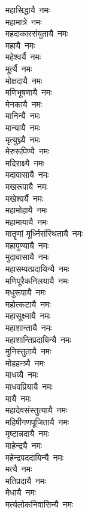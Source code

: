 \begin{flushleft}
\begin{multicols}{2}
महासिद्धायै~नमः\hfill{}\\
महामात्रे~नमः\\
महदाकारसंयुतायै~नमः\\
महायै~नमः\\
महेश्वर्यै~नमः\\
मूर्त्यै~नमः\\
मोक्षदायै~नमः\\
मणिभूषणायै~नमः\\
मेनकायै~नमः\\
मानिन्यै~नमः\\
मान्यायै~नमः\hfill{}\\
मृत्युघ्न्यै~नमः\\
मेरुरूपिण्यै~नमः\\
मदिराक्ष्यै~नमः\\
मदावासायै~नमः\\
मखरूपायै~नमः\\
मखेश्वर्यै~नमः\\
महामोहायै~नमः\\
महामायायै~नमः\\
मातॄणां मूर्ध्निसंस्थितायै~नमः\\
महापुण्यायै~नमः\hfill{}\\
मुदावासायै~नमः\\
महासम्पत्प्रदायिन्यै~नमः\\
मणिपूरैकनिलयायै~नमः\\
मधुरूपायै~नमः\\
महोत्कटायै~नमः\\
महासूक्ष्मायै~नमः\\
महाशान्तायै~नमः\\
महाशान्तिप्रदायिन्यै~नमः\\
मुनिस्तुतायै~नमः\\
मोहहन्त्र्यै~नमः\hfill{}\\
माधव्यै~नमः\\
माधवप्रियायै~नमः\\
मायै~नमः\\
महादेवसंस्तुत्यायै~नमः\\
महिषीगणपूजितायै~नमः\\
मृष्टान्नदायै~नमः\\
माहेन्द्र्यै~नमः\\
महेन्द्रपददायिन्यै~नमः\\
मत्यै~नमः\\
मतिप्रदायै~नमः\hfill{}\\
मेधायै~नमः\\
मर्त्यलोकनिवासिन्यै~नमः\\

\end{multicols}
\end{flushleft}
